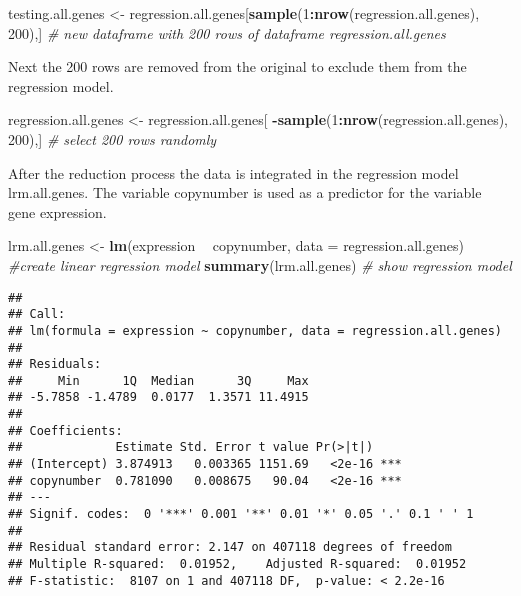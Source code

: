 \documentclass[]{article}
\newenvironment{Shaded}{\begin{snugshade}}{\end{snugshade}}
\newcommand{\CommentTok}[1]{\textcolor[rgb]{0.56,0.35,0.01}{\textit{#1}}}
\newcommand{\DataTypeTok}[1]{\textcolor[rgb]{0.13,0.29,0.53}{#1}}
\newcommand{\DecValTok}[1]{\textcolor[rgb]{0.00,0.00,0.81}{#1}}
\newcommand{\KeywordTok}[1]{\textcolor[rgb]{0.13,0.29,0.53}{\textbf{#1}}}
\newcommand{\NormalTok}[1]{#1}
\newcommand{\OperatorTok}[1]{\textcolor[rgb]{0.81,0.36,0.00}{\textbf{#1}}}
\newcommand{\StringTok}[1]{\textcolor[rgb]{0.31,0.60,0.02}{#1}}
\begin{document}
\begin{Shaded}
\begin{Highlighting}[]
\NormalTok{testing.all.genes <-}\StringTok{ }\NormalTok{regression.all.genes[}\KeywordTok{sample}\NormalTok{(}\DecValTok{1}\OperatorTok{:}\KeywordTok{nrow}\NormalTok{(regression.all.genes), }\DecValTok{200}\NormalTok{),] }\CommentTok{# new dataframe with 200 rows of dataframe regression.all.genes}
\end{Highlighting}
\end{Shaded}

Next the 200 rows are removed from the original to exclude them from the
regression model.

\begin{Shaded}
\begin{Highlighting}[]
\NormalTok{regression.all.genes <-}\StringTok{ }\NormalTok{regression.all.genes[ }\OperatorTok{-}\KeywordTok{sample}\NormalTok{(}\DecValTok{1}\OperatorTok{:}\KeywordTok{nrow}\NormalTok{(regression.all.genes), }\DecValTok{200}\NormalTok{),] }\CommentTok{# select 200 rows randomly }
\end{Highlighting}
\end{Shaded}

After the reduction process the data is integrated in the regression
model lrm.all.genes. The variable copynumber is used as a predictor for
the variable gene expression.

\begin{Shaded}
\begin{Highlighting}[]
\NormalTok{lrm.all.genes <-}\StringTok{ }\KeywordTok{lm}\NormalTok{(expression }\OperatorTok{~}\StringTok{ }\NormalTok{copynumber, }\DataTypeTok{data =}\NormalTok{ regression.all.genes) }\CommentTok{#create linear regression model}
\KeywordTok{summary}\NormalTok{(lrm.all.genes) }\CommentTok{# show regression model }
\end{Highlighting}
\end{Shaded}

\begin{verbatim}
## 
## Call:
## lm(formula = expression ~ copynumber, data = regression.all.genes)
## 
## Residuals:
##     Min      1Q  Median      3Q     Max 
## -5.7858 -1.4789  0.0177  1.3571 11.4915 
## 
## Coefficients:
##             Estimate Std. Error t value Pr(>|t|)    
## (Intercept) 3.874913   0.003365 1151.69   <2e-16 ***
## copynumber  0.781090   0.008675   90.04   <2e-16 ***
## ---
## Signif. codes:  0 '***' 0.001 '**' 0.01 '*' 0.05 '.' 0.1 ' ' 1
## 
## Residual standard error: 2.147 on 407118 degrees of freedom
## Multiple R-squared:  0.01952,    Adjusted R-squared:  0.01952 
## F-statistic:  8107 on 1 and 407118 DF,  p-value: < 2.2e-16
\end{verbatim}
\end{document}
